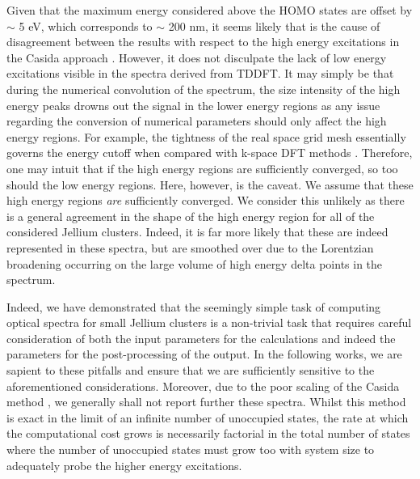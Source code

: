 Given that the maximum energy considered above the HOMO states are offset by $\sim$ 5 eV, which corresponds to $\sim$ 200 nm, it seems likely that is the cause of disagreement between the results with respect to the high energy excitations in the Casida approach \cite{Casida}. However, it does not disculpate the lack of low energy excitations visible in the spectra derived from TDDFT. It may simply be that during the numerical convolution of the spectrum, the size intensity of the high energy peaks drowns out the signal in the lower energy regions as any issue regarding the conversion of numerical parameters should only affect the high energy regions. For example, the tightness of the real space grid mesh essentially governs the energy cutoff when compared with k-space DFT methods \cite{cp2k_2020}. Therefore, one may intuit that if the high energy regions are sufficiently converged, so too should the low energy regions. Here, however, is the caveat. We assume that these high energy regions \textit{are} sufficiently converged. We consider this unlikely as there is a general agreement in the shape of the high energy region for all of the considered Jellium clusters. Indeed, it is far more likely that these are indeed represented in these spectra, but are smoothed over due to the Lorentzian broadening occurring on the large volume of high energy delta points in the spectrum. 

Indeed, we have demonstrated that the seemingly simple task of computing optical spectra for small Jellium clusters is a non-trivial task that requires careful consideration of both the input parameters for the calculations and indeed the parameters for the post-processing of the output. In the following works, we are sapient to these pitfalls and ensure that we are sufficiently sensitive to the aforementioned considerations. Moreover, due to the poor scaling of the Casida method \cite{Casida}, we generally shall not report further these spectra. Whilst this method is exact in the limit of an infinite number of unoccupied states, the rate at which the computational cost grows is necessarily factorial in the total number of states where the number of unoccupied states must grow too with system size to adequately probe the higher energy excitations. 

